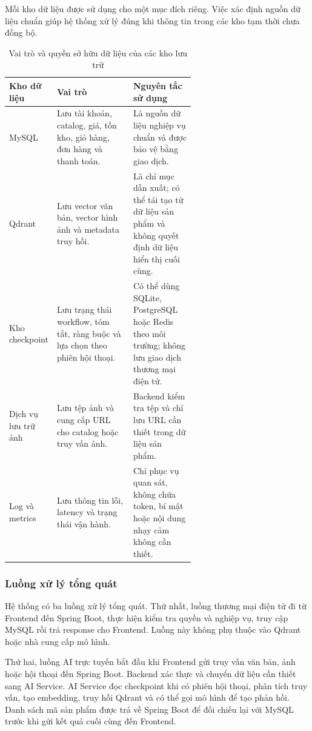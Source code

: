 Mỗi kho dữ liệu được sử dụng cho một mục đích riêng. Việc xác định nguồn dữ liệu chuẩn giúp hệ thống xử lý đúng khi thông tin trong các kho tạm thời chưa đồng bộ.

\begin{table}[H]
\centering
\caption{Vai trò và quyền sở hữu dữ liệu của các kho lưu trữ}
\label{tab:overview-data-ownership}
\begin{tabularx}{\linewidth}{|p{0.20\linewidth}|p{0.41\linewidth}|X|}
\hline
\textbf{Kho dữ liệu} & \textbf{Vai trò} & \textbf{Nguyên tắc sử dụng} \\ \hline
MySQL & Lưu tài khoản, catalog, giá, tồn kho, giỏ hàng, đơn hàng và thanh toán. & Là nguồn dữ liệu nghiệp vụ chuẩn và được bảo vệ bằng giao dịch. \\ \hline
Qdrant & Lưu vector văn bản, vector hình ảnh và metadata truy hồi. & Là chỉ mục dẫn xuất; có thể tái tạo từ dữ liệu sản phẩm và không quyết định dữ liệu hiển thị cuối cùng. \\ \hline
Kho checkpoint & Lưu trạng thái workflow, tóm tắt, ràng buộc và lựa chọn theo phiên hội thoại. & Có thể dùng SQLite, PostgreSQL hoặc Redis theo môi trường; không lưu giao dịch thương mại điện tử. \\ \hline
Dịch vụ lưu trữ ảnh & Lưu tệp ảnh và cung cấp URL cho catalog hoặc truy vấn ảnh. & Backend kiểm tra tệp và chỉ lưu URL cần thiết trong dữ liệu sản phẩm. \\ \hline
Log và metrics & Lưu thông tin lỗi, latency và trạng thái vận hành. & Chỉ phục vụ quan sát, không chứa token, bí mật hoặc nội dung nhạy cảm không cần thiết. \\ \hline
\end{tabularx}
\end{table}

\subsubsection{Luồng xử lý tổng quát}

Hệ thống có ba luồng xử lý tổng quát. Thứ nhất, luồng thương mại điện tử đi từ Frontend đến Spring Boot, thực hiện kiểm tra quyền và nghiệp vụ, truy cập MySQL rồi trả response cho Frontend. Luồng này không phụ thuộc vào Qdrant hoặc nhà cung cấp mô hình.

Thứ hai, luồng AI trực tuyến bắt đầu khi Frontend gửi truy vấn văn bản, ảnh hoặc hội thoại đến Spring Boot. Backend xác thực và chuyển dữ liệu cần thiết sang AI Service. AI Service đọc checkpoint khi có phiên hội thoại, phân tích truy vấn, tạo embedding, truy hồi Qdrant và có thể gọi mô hình để tạo phản hồi. Danh sách mã sản phẩm được trả về Spring Boot để đối chiếu lại với MySQL trước khi gửi kết quả cuối cùng đến Frontend.

